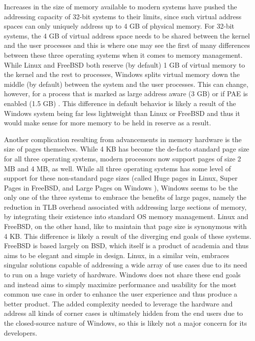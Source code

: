 \documentclass[onecolumn, draftclsnofoot,10pt, compsoc]{IEEEtran}
\begin{document}
Increases in the size of memory available to modern systems have pushed the addressing capacity of 32-bit systems to their limits, since such virtual address spaces can only uniquely address up to 4 GB of physical memory. For 32-bit systems, the 4 GB of virtual address space needs to be shared between the kernel and the user processes and this is where one may see the first of many differences between these three operating systems when it comes to memory management. While Linux and FreeBSD both reserve (by default) 1 GB of virtual memory to the kernel and the rest to processes, Windows splits virtual memory down the middle (by default) between the system and the user processes. This can change, however, for a process that is marked as large address aware (3 GB) or if PAE is enabled (1.5 GB) \cite{WindowsInternals2}. This difference in default behavior is likely a result of the Windows system being far less lightweight than Linux or FreeBSD and thus it would make sense for more memory to be held in reserve as a result. 

Another complication resulting from advancements in memory hardware is the size of pages themselves. While 4 KB has become the de-facto standard page size for all three operating systems, modern processors now support pages of size 2 MB and 4 MB, as well. While all three operating systems has some level of support for these non-standard page sizes (called Huge pages in Linux, Super Pages in FreeBSD, and Large Pages on Windows \cite{Hugepages}), Windows seems to be the only one of the three systems to embrace the benefits of large pages, namely the reduction in TLB overhead associated with addressing large sections of memory, by integrating their existence into standard OS memory management. Linux and FreeBSD, on the other hand, like to maintain that page size is synonymous with 4 KB. This difference is likely a result of the diverging end goals of these systems. FreeBSD is based largely on BSD, which itself is a product of academia and thus aims to be elegant and simple in design. Linux, in a similar vein, embraces singular solutions capable of addressing a wide array of use cases due to its need to run on a huge variety of hardware. Windows does not share these end goals and instead aims to simply maximize performance and usability for the most common use case in order to enhance the user experience and thus produce a better product. The added complexity needed to leverage the hardware and address all kinds of corner cases is ultimately hidden from the end users due to the closed-source nature of Windows, so this is likely not a major concern for its developers.
\end{document}
